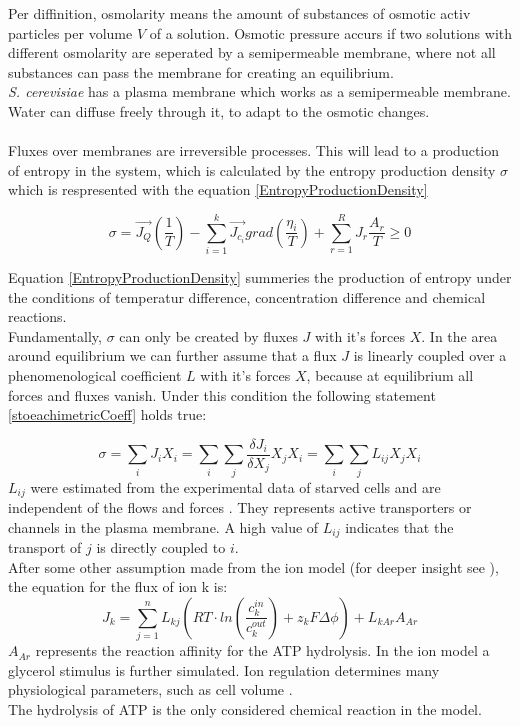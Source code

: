 Per diffinition, osmolarity means the amount of substances of osmotic activ particles per volume $V$ of a solution. Osmotic pressure accurs if two solutions with different osmolarity are seperated by a semipermeable membrane, where not all substances can pass the membrane for creating an equilibrium.\\
\emph{S. cerevisiae} has a plasma membrane which works as a semipermeable membrane. Water can diffuse freely through it, to adapt to the osmotic changes. \\\\

Fluxes over membranes are irreversible processes. This will lead to a production of entropy in the system, which is calculated by the entropy production density $\sigma$ which is respresented with the equation \ref{EntropyProductionDensity}

\begin{equation}\label{EntropyProductionDensity}
	\sigma = \vec{J_Q}\left(\frac{1}{T}\right) - \sum_{i=1}^{k}\vec{J_{c_i}}grad \left(\frac{\eta _i}{T}\right) + \sum_{r=1}^{R}J_r \frac{A_r}{T} \geq 0
\end{equation}

Equation \ref{EntropyProductionDensity} summeries the production of entropy under the conditions of temperatur difference, concentration difference and chemical reactions. \\
Fundamentally, $\sigma$ can only be created by fluxes $J$ with it’s forces $X$. In the area around equilibrium we can further assume that a flux $J$ is linearly coupled over a phenomenological coefficient $L$ with it’s forces $X$, because at equilibrium all forces and fluxes vanish. Under this condition the following statement \ref{stoeachimetricCoeff} holds true:

\begin{equation}\label{stoeachimetricCoeff}
	\sigma = \sum_{i}J_i X_i = \sum_{i}\sum_{j} \frac{\delta J_i}{\delta X_j}X_j X_i= \sum_{i}\sum_{j}L_{ij}X_j X_i
\end{equation}
$L_{ij}$ were estimated from the experimental data of starved cells and are independent of the flows and forces \cite{Gerber_2016}. They represents active transporters or channels in the plasma membrane. A high value of $L_{ij}$ indicates that the transport of $j$ is directly coupled to $i$. \\
After some other assumption made from the ion model (for deeper insight see \cite{Gerber_2016}), the equation for the flux of ion k is:
\begin{equation}\label{IonFlux}
J_k = \sum_{j=1}^n L_{kj}(RT\cdot ln\left(\frac{c_k^{in}}{c_k^{out}}\right) + z_kF\Delta \phi ) + L_{kAr}A_{Ar}
\end{equation}
$A_{Ar}$ represents the reaction affinity for the ATP hydrolysis.
In the ion model a glycerol stimulus is further simulated. Ion regulation determines many physiological parameters, such as cell volume \cite{Ke_2013}.\\
The hydrolysis of ATP is the only considered chemical reaction in the model.

